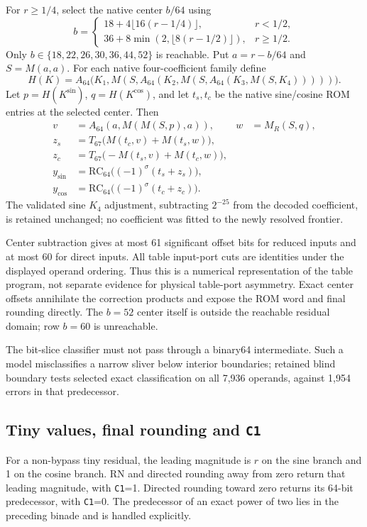 \documentclass[11pt]{article}
\begin{document}
For $r\ge1/4$, select the native center $b/64$ using
\[
 b=\begin{cases}
 18+4\lfloor16(r-1/4)\rfloor,&r<1/2,\\
 36+8\min(2,\lfloor8(r-1/2)\rfloor),&r\ge1/2.
 \end{cases}
\]
Only $b\in\{18,22,26,30,36,44,52\}$ is reachable.
Put $a=r-b/64$ and $S=M(a,a)$.
For each native four-coefficient family define
\[
 H(K)=A_{64}\bigl(K_1,M(S,A_{64}(K_2,
             M(S,A_{64}(K_3,M(S,K_4)))))\bigr).
\]
Let $p=H(K^{\sin})$, $q=H(K^{\cos})$, and let $t_s,t_c$ be the
native sine/cosine ROM entries at the selected center. Then
\[
 \begin{aligned}
 v&=A_{64}(a,M(M(S,p),a)),& w&=M_R(S,q),\\
 z_s&=T_{67}\bigl(M(t_c,v)+M(t_s,w)\bigr),\\
 z_c&=T_{67}\bigl(-M(t_s,v)+M(t_c,w)\bigr),\\
 y_{\sin}&=\mathrm{RC}_{64}\bigl((-1)^\sigma(t_s+z_s)\bigr),\\
 y_{\cos}&=\mathrm{RC}_{64}\bigl((-1)^\sigma(t_c+z_c)\bigr).
 \end{aligned}
\]
The validated sine $K_4$ adjustment, subtracting $2^{-25}$ from
the decoded coefficient, is retained unchanged; no coefficient was fitted
to the newly resolved frontier.

Center subtraction gives at most 61 significant offset bits for reduced
inputs and at most 60 for direct inputs. All table input-port cuts are
identities under the displayed operand ordering. Thus this is a numerical
representation of the table program, not separate evidence for physical
table-port asymmetry. Exact center offsets annihilate the correction
products and expose the ROM word and final rounding directly. The $b=52$
center itself is outside the reachable residual domain; row $b=60$ is
unreachable.

The bit-slice classifier must not pass through a binary64 intermediate.
Such a model misclassifies a narrow sliver below interior boundaries;
retained blind boundary tests selected exact classification on all
7{,}936 operands, against 1{,}954 errors in that predecessor.

\subsection{Tiny values, final rounding and \texttt{C1}}
\label{sec:tiny}

For a non-bypass tiny residual, the leading magnitude is $r$ on the sine
branch and 1 on the cosine branch. RN and directed rounding away from zero
return that leading magnitude, with \texttt{C1}=1. Directed rounding toward
zero returns its 64-bit predecessor, with \texttt{C1}=0. The predecessor of
an exact power of two lies in the preceding binade and is handled explicitly.
\end{document}
